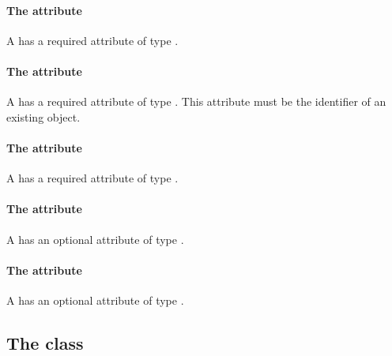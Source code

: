 \paragraph{The \fixttspace{} attribute}

A \SampledVolume has a required attribute  of type
.


\paragraph{The \fixttspace{} attribute}

A \SampledVolume has a required attribute  of type
.
This attribute must be the identifier of an existing \DomainType object.


\paragraph{The \fixttspace{} attribute}

A \SampledVolume has a required attribute  of type
.


\paragraph{The \fixttspace{} attribute}

A \SampledVolume has an optional attribute  of type
.


\paragraph{The \fixttspace{} attribute}

A \SampledVolume has an optional attribute  of type
.


\subsection{The  class}
\label{analyticgeometry-class}



